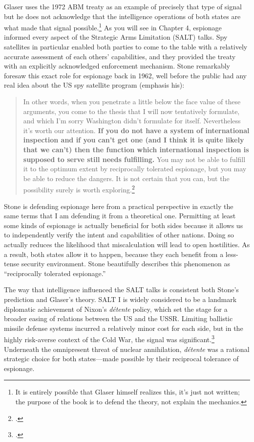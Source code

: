 \documentclass[11pt]{memoir}
\begin{document}
\begin{refsegment}
Glaser uses the 1972 ABM treaty as an example of precisely that type of signal but he does not acknowledge that the intelligence operations of both states are what made that signal possible.\footnote{It is entirely possible that Glaser himself realizes this, it's just not written; the purpose of the book is to defend the theory, not explain the mechanics.} As you will see in Chapter 4, espionage informed every aspect of the Strategic Arms Limitation (SALT) talks. Spy satellites in particular enabled both parties to come to the table with a relatively accurate assessment of each others' capabilities, and they provided the treaty with an explicitly acknowledged enforcement mechanism. Stone remarkably foresaw this exact role for espionage back in 1962, well before the public had any real idea about the US spy satellite program (emphasis his):

\begin{quote}
In other words, when you penetrate a little below the face value of these arguments, you come to the thesis that I will now tentatively formulate, and which I'm sorry Washington didn't formulate for itself. Nevertheless it's worth our attention. \textbf{If you do not have a system of international inspection and if you can't get one (and I think it is quite likely that we can't) then the function which international inspection is supposed to serve still needs fulfilling.} You may not be able to fulfill it to the optimum extent by reciprocally tolerated espionage, but you may be able to reduce the dangers. It is not certain that you can, but the possibility surely is worth exploring.\footcite[p.~41]{stone_legal_1962}
\end{quote}

Stone is defending espionage here from a practical perspective in exactly the same terms that I am defending it from a theoretical one. Permitting at least some kinds of espionage is actually beneficial for both sides because it allows us to independently verify the intent and capabilities of other nations. Doing so actually reduces the likelihood that miscalculation will lead to open hostilities. As a result, both states allow it to happen, because they each benefit from a less-tense security environment. Stone beautifully describes this phenomenon as ``reciprocally tolerated espionage.''

The way that intelligence influenced the SALT talks is consistent both Stone's prediction and Glaser's theory. SALT I is widely considered to be a landmark diplomatic achievement of Nixon's \emph{d\'etente} policy, which set the stage for a broader easing of relations between the US and the USSR. Limiting ballistic missile defense systems incurred a relatively minor cost for each side, but in the highly risk-averse context of the Cold War, the signal was significant.\footcite[p.~66]{glaser_rational_2010} Underneath the omnipresent threat of nuclear annihilation, \emph{d\'etente} was a rational strategic choice for both states---made possible by their reciprocal tolerance of espionage.


\end{refsegment}
\end{document}
